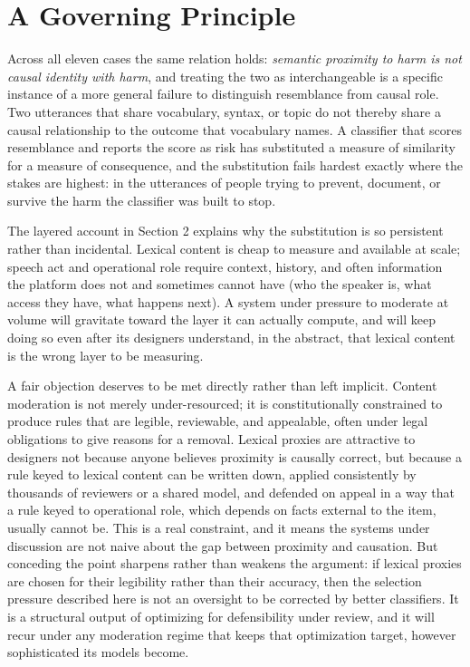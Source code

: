 \documentclass[11pt]{article}
\begin{document}
\section{A Governing Principle}

Across all eleven cases the same relation holds: \emph{semantic proximity to harm is not causal identity with harm}, and treating the two as interchangeable is a specific instance of a more general failure to distinguish resemblance from causal role. Two utterances that share vocabulary, syntax, or topic do not thereby share a causal relationship to the outcome that vocabulary names. A classifier that scores resemblance and reports the score as risk has substituted a measure of similarity for a measure of consequence, and the substitution fails hardest exactly where the stakes are highest: in the utterances of people trying to prevent, document, or survive the harm the classifier was built to stop.

The layered account in Section 2 explains why the substitution is so persistent rather than incidental. Lexical content is cheap to measure and available at scale; speech act and operational role require context, history, and often information the platform does not and sometimes cannot have (who the speaker is, what access they have, what happens next). A system under pressure to moderate at volume will gravitate toward the layer it can actually compute, and will keep doing so even after its designers understand, in the abstract, that lexical content is the wrong layer to be measuring.

A fair objection deserves to be met directly rather than left implicit. Content moderation is not merely under-resourced; it is constitutionally constrained to produce rules that are legible, reviewable, and appealable, often under legal obligations to give reasons for a removal. Lexical proxies are attractive to designers not because anyone believes proximity is causally correct, but because a rule keyed to lexical content can be written down, applied consistently by thousands of reviewers or a shared model, and defended on appeal in a way that a rule keyed to operational role, which depends on facts external to the item, usually cannot be. This is a real constraint, and it means the systems under discussion are not naive about the gap between proximity and causation. But conceding the point sharpens rather than weakens the argument: if lexical proxies are chosen for their legibility rather than their accuracy, then the selection pressure described here is not an oversight to be corrected by better classifiers. It is a structural output of optimizing for defensibility under review, and it will recur under any moderation regime that keeps that optimization target, however sophisticated its models become.
\end{document}
